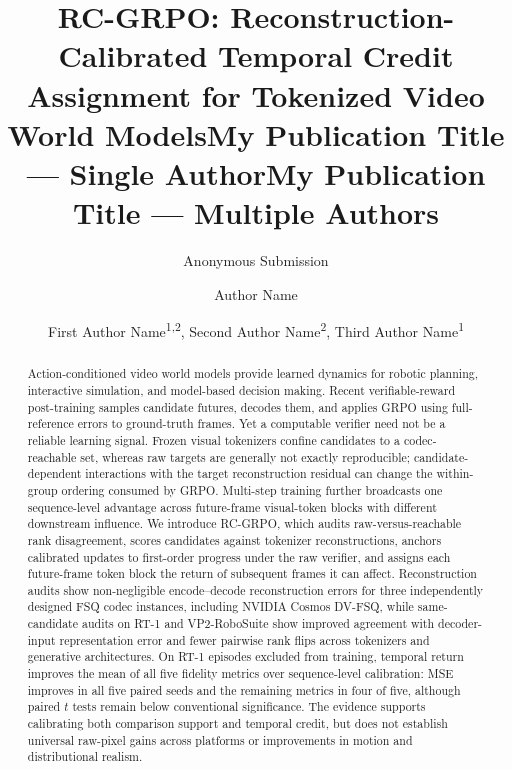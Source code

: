 \documentclass[letterpaper]{article} %
\title{RC-GRPO: Reconstruction-Calibrated Temporal Credit Assignment for Tokenized Video World Models}
\author{Anonymous Submission}
\title{My Publication Title --- Single Author}
\author {
    Author Name
}
\title{My Publication Title --- Multiple Authors}
\author {
    First Author Name\textsuperscript{\rm 1,\rm 2}\equalcontrib,
    Second Author Name\textsuperscript{\rm 2}\equalcontrib,
    Third Author Name\textsuperscript{\rm 1}\corresponding
}
\begin{document}
\maketitle

\begin{abstract}
Action-conditioned video world models provide learned dynamics for robotic planning, interactive simulation, and model-based decision making. Recent verifiable-reward post-training samples candidate futures, decodes them, and applies GRPO using full-reference errors to ground-truth frames. Yet a computable verifier need not be a reliable learning signal. Frozen visual tokenizers confine candidates to a codec-reachable set, whereas raw targets are generally not exactly reproducible; candidate-dependent interactions with the target reconstruction residual can change the within-group ordering consumed by GRPO. Multi-step training further broadcasts one sequence-level advantage across future-frame visual-token blocks with different downstream influence. We introduce RC-GRPO, which audits raw-versus-reachable rank disagreement, scores candidates against tokenizer reconstructions, anchors calibrated updates to first-order progress under the raw verifier, and assigns each future-frame token block the return of subsequent frames it can affect. Reconstruction audits show non-negligible encode--decode reconstruction errors for three independently designed FSQ codec instances, including NVIDIA Cosmos DV-FSQ, while same-candidate audits on RT-1 and VP2-RoboSuite show improved agreement with decoder-input representation error and fewer pairwise rank flips across tokenizers and generative architectures. On RT-1 episodes excluded from training, temporal return improves the mean of all five fidelity metrics over sequence-level calibration: MSE improves in all five paired seeds and the remaining metrics in four of five, although paired $t$ tests remain below conventional significance. The evidence supports calibrating both comparison support and temporal credit, but does not establish universal raw-pixel gains across platforms or improvements in motion and distributional realism.
\end{abstract}

\end{document}
